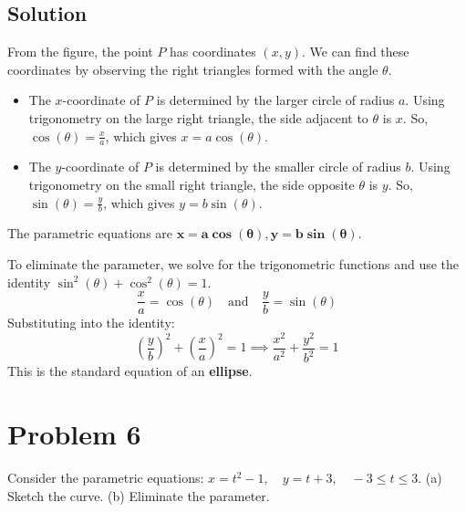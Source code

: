 \documentclass{article}
\begin{document}
\subsection*{Solution}
From the figure, the point $P$ has coordinates $(x,y)$. We can find these coordinates by observing the right triangles formed with the angle $\theta$.
\begin{itemize}
    \item The $x$-coordinate of $P$ is determined by the larger circle of radius $a$. Using trigonometry on the large right triangle, the side adjacent to $\theta$ is $x$. So, $\cos(\theta) = \frac{x}{a}$, which gives $x = a \cos(\theta)$.
    \item The $y$-coordinate of $P$ is determined by the smaller circle of radius $b$. Using trigonometry on the small right triangle, the side opposite $\theta$ is $y$. So, $\sin(\theta) = \frac{y}{b}$, which gives $y = b \sin(\theta)$.
\end{itemize}
The parametric equations are $\boldsymbol{x = a \cos(\theta), y = b \sin(\theta)}$.

To eliminate the parameter, we solve for the trigonometric functions and use the identity $\sin^2(\theta) + \cos^2(\theta) = 1$.
\[ \frac{x}{a} = \cos(\theta) \quad \text{and} \quad \frac{y}{b} = \sin(\theta) \]
Substituting into the identity:
\[ \left(\frac{y}{b}\right)^2 + \left(\frac{x}{a}\right)^2 = 1 \implies \frac{x^2}{a^2} + \frac{y^2}{b^2} = 1 \]
This is the standard equation of an \textbf{ellipse}.

\section{Problem 6}
Consider the parametric equations: $x = t^2 - 1, \quad y = t + 3, \quad -3 \le t \le 3$.
(a) Sketch the curve.
(b) Eliminate the parameter.
\end{document}
